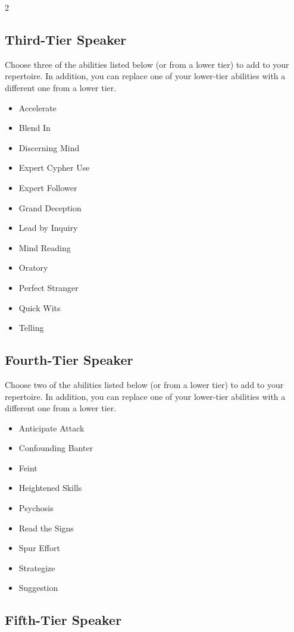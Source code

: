 \begin{multicols}{2}
\subsection{Third-Tier Speaker}

Choose three of the abilities listed below (or from a lower tier) to add to your repertoire. In addition, you can replace one of your lower-tier abilities with a different one from a lower tier.

\begin{itemize}
\item Accelerate
\item Blend In
\item Discerning Mind
\item Expert Cypher Use
\item Expert Follower
\item Grand Deception
\item Lead by Inquiry
\item Mind Reading
\item Oratory
\item Perfect Stranger
\item Quick Wits
\item Telling
\end{itemize} 

\subsection{Fourth-Tier Speaker}

Choose two of the abilities listed below (or from a lower tier) to add to your repertoire. In addition, you can replace one of your lower-tier abilities with a different one from a lower tier.

\begin{itemize}
\item Anticipate Attack
\item Confounding Banter
\item Feint
\item Heightened Skills
\item Psychosis
\item Read the Signs
\item Spur Effort
\item Strategize
\item Suggestion
\end{itemize}

\subsection{Fifth-Tier Speaker}


\end{multicols}
